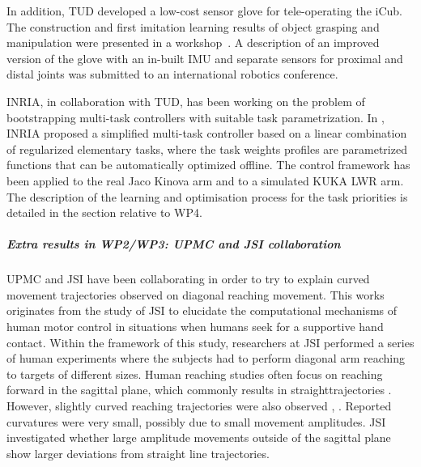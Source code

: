 In addition, TUD developed a low-cost sensor glove for tele-operating the iCub. The construction and first imitation learning results of object grasping and manipulation were presented in a workshop~\cite{RueckertICRAWS2015}. A description of an improved version of the glove with an in-built IMU and separate sensors for proximal and distal joints was submitted to an international robotics conference. 

INRIA, in collaboration with TUD, has been working on the problem of bootstrapping multi-task controllers with suitable task parametrization. 
In \cite{Modugno2016}, INRIA proposed a simplified multi-task controller based on a linear combination of regularized elementary tasks, where the task weights profiles are parametrized functions that can be automatically optimized offline. The control framework has been applied to the real Jaco Kinova arm and to a simulated KUKA LWR arm.
The description of the learning and optimisation process for the task priorities is detailed in the section relative to WP4.


\subparagraph*{Extra results in WP2/WP3: UPMC and JSI collaboration}

UPMC and JSI have been collaborating in order to try to explain curved movement trajectories observed on diagonal reaching movement. This works originates from the study of JSI to elucidate the computational mechanisms of human motor control in situations when humans seek for a supportive hand contact. Within the framework of this study, researchers at JSI performed a series of human experiments where the subjects had to perform diagonal arm reaching to targets of different sizes. Human reaching studies often focus on reaching forward in the sagittal plane, which commonly results in straighttrajectories \cite{ThoroughmanNature2000}. However, slightly curved reaching trajectories were also observed \cite{IzawaJNeuro2008}, \cite{UnoBioCyber1989}. Reported curvatures were very small, possibly due to small movement amplitudes. JSI investigated whether large amplitude movements outside of the sagittal plane show larger deviations from straight line trajectories.

